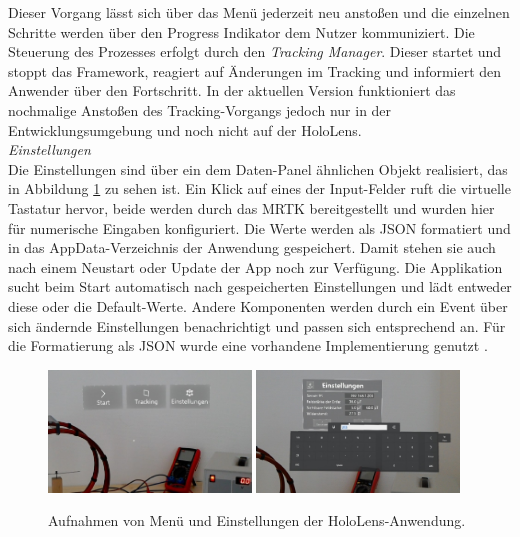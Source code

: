Dieser Vorgang lässt sich über das Menü jederzeit neu anstoßen und die einzelnen Schritte werden über den Progress Indikator dem Nutzer kommuniziert. Die Steuerung des Prozesses erfolgt durch den \textit{Tracking Manager}. Dieser startet und stoppt das Framework, reagiert auf Änderungen im Tracking und informiert den Anwender über den Fortschritt. In der aktuellen Version funktioniert das nochmalige Anstoßen des Tracking-Vorgangs jedoch nur in der Entwicklungsumgebung und noch nicht auf der HoloLens.\\

\textit{Einstellungen}\\
Die Einstellungen sind über ein dem Daten-Panel ähnlichen Objekt realisiert, das in Abbildung \ref{img:menu-and-settings} zu sehen ist. Ein Klick auf eines der Input-Felder ruft die virtuelle Tastatur hervor, beide werden durch das MRTK bereitgestellt und wurden hier für numerische Eingaben konfiguriert. Die Werte werden als JSON formatiert und in das AppData-Verzeichnis der Anwendung gespeichert. Damit stehen sie auch nach einem Neustart oder Update der App noch zur Verfügung. Die Applikation sucht beim Start automatisch nach gespeicherten Einstellungen und lädt entweder diese oder die Default-Werte. Andere Komponenten werden durch ein Event über sich ändernde Einstellungen benachrichtigt und passen sich entsprechend an. Für die Formatierung als JSON wurde eine vorhandene Implementierung genutzt \cite{Goebel17}.\\

\begin{figure}[H]
	\centering
	\includegraphics[width=0.48\textwidth]{images/HL/menu_c.jpg}
	\hspace{0.02\textwidth}	
	\includegraphics[width=0.48\textwidth]{images/HL/settings_c.jpg}
	\caption{Aufnahmen von Menü und Einstellungen der HoloLens-Anwendung.}
	\label{img:menu-and-settings}
\end{figure}

